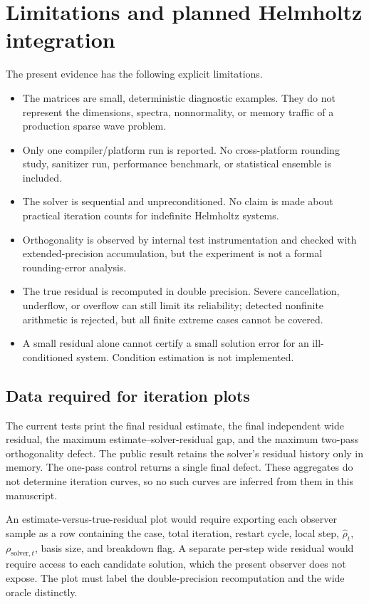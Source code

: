 \section{Limitations and planned Helmholtz integration}

The present evidence has the following explicit limitations.
\begin{itemize}
    \item The matrices are small, deterministic diagnostic examples. They do not
    represent the dimensions, spectra, nonnormality, or memory traffic of a
    production sparse wave problem.
    \item Only one compiler/platform run is reported. No cross-platform rounding
    study, sanitizer run, performance benchmark, or statistical ensemble is
    included.
    \item The solver is sequential and unpreconditioned. No claim is made about
    practical iteration counts for indefinite Helmholtz systems.
    \item Orthogonality is observed by internal test instrumentation and checked
    with extended-precision accumulation, but the experiment is not a formal
    rounding-error analysis.
    \item The true residual is recomputed in double precision. Severe cancellation,
    underflow, or overflow can still limit its reliability; detected nonfinite
    arithmetic is rejected, but all finite extreme cases cannot be covered.
    \item A small residual alone cannot certify a small solution error for an
    ill-conditioned system. Condition estimation is not implemented.
\end{itemize}

\subsection{Data required for iteration plots}

The current tests print the final residual estimate, the final independent wide
residual, the maximum estimate--solver-residual gap, and the maximum two-pass
orthogonality defect. The public result retains the solver's residual history
only in memory. The one-pass control returns a single final defect. These
aggregates do not determine iteration curves, so no such curves are inferred
from them in this manuscript.

An estimate-versus-true-residual plot would require exporting each observer
sample as a row containing the case, total iteration, restart cycle, local step,
$\widehat{\rho}_t$, $\rho_{\mathrm{solver},t}$, basis size, and breakdown flag.
A separate per-step wide residual would require access to each candidate
solution, which the present observer does not expose. The plot must label the
double-precision recomputation and the wide oracle distinctly.

